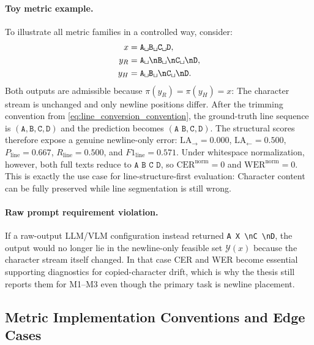 \paragraph{Toy metric example.}
To illustrate all metric families in a controlled way, consider:
\[
\begin{aligned}
x&=\texttt{A\textvisiblespace B\textvisiblespace C\textvisiblespace D},\\
y_R&=\texttt{A\textvisiblespace\textbackslash nB\textvisiblespace\textbackslash nC\textvisiblespace\textbackslash nD},\\
y_H&=\texttt{A\textvisiblespace B\textvisiblespace\textbackslash nC\textvisiblespace\textbackslash nD}.
\end{aligned}
\]
Both outputs are admissible because \(\pi(y_R)=\pi(y_H)=x\): The character stream is unchanged and only newline positions differ. After the trimming convention from \autoref{eq:line_conversion_convention}, the ground-truth line sequence is \((\texttt{A},\texttt{B},\texttt{C},\texttt{D})\) and the prediction becomes \((\texttt{A B},\texttt{C},\texttt{D})\). The structural scores therefore expose a genuine newline-only error: \(\mathrm{LA}_{\rightarrow}=0.000\), \(\mathrm{LA}_{\leftarrow}=0.500\), \(P_{\mathrm{line}}=0.667\), \(R_{\mathrm{line}}=0.500\), and \(F1_{\mathrm{line}}=0.571\). Under whitespace normalization, however, both full texts reduce to \(\texttt{A B C D}\), so \(\mathrm{CER}^{\mathrm{norm}}=0\) and \(\mathrm{WER}^{\mathrm{norm}}=0\). This is exactly the use case for line-structure-first evaluation: Character content can be fully preserved while line segmentation is still wrong.

\paragraph{Raw prompt requirement violation.}
If a raw-output LLM/VLM configuration instead returned \texttt{A X \textbackslash nC \textbackslash nD}, the output would no longer lie in the newline-only feasible set \(\mathcal{Y}(x)\) because the character stream itself changed. In that case CER and WER become essential supporting diagnostics for copied-character drift, which is why the thesis still reports them for M1--M3 even though the primary task is newline placement.

\subsection{Metric Implementation Conventions and Edge Cases}
\label{sec:experimentation_metric_conventions}

